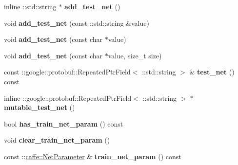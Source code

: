 \begin{DoxyCompactItemize}
inline \+::std\+::string $\ast$ {\bfseries add\+\_\+test\+\_\+net} ()
\item 
\mbox{\label{classcaffe_1_1_solver_parameter_a175c3d63f60d157a61fb1f4213c0b5a3}} 
void {\bfseries add\+\_\+test\+\_\+net} (const \+::std\+::string \&value)
\item 
\mbox{\label{classcaffe_1_1_solver_parameter_a7a4725f8ad48670dce5179ced7a8e76b}} 
void {\bfseries add\+\_\+test\+\_\+net} (const char $\ast$value)
\item 
\mbox{\label{classcaffe_1_1_solver_parameter_a3d6b70555df3bf7cec2657ca2fa1e87d}} 
void {\bfseries add\+\_\+test\+\_\+net} (const char $\ast$value, size\+\_\+t size)
\item 
\mbox{\label{classcaffe_1_1_solver_parameter_a72d6b993f84ab0ef1108049ac50b0f70}} 
const \+::google\+::protobuf\+::\+Repeated\+Ptr\+Field$<$ \+::std\+::string $>$ \& {\bfseries test\+\_\+net} () const
\item 
\mbox{\label{classcaffe_1_1_solver_parameter_a550350a34dc52446a7dadb5e0d40029c}} 
inline \+::google\+::protobuf\+::\+Repeated\+Ptr\+Field$<$ \+::std\+::string $>$ $\ast$ {\bfseries mutable\+\_\+test\+\_\+net} ()
\item 
\mbox{\label{classcaffe_1_1_solver_parameter_aa324451e3753df304e4265c2bc2e7bf9}} 
bool {\bfseries has\+\_\+train\+\_\+net\+\_\+param} () const
\item 
\mbox{\label{classcaffe_1_1_solver_parameter_a95a45bbc191886034efdf83141dfcb36}} 
void {\bfseries clear\+\_\+train\+\_\+net\+\_\+param} ()
\item 
\mbox{\label{classcaffe_1_1_solver_parameter_a919944b6022af30e6a142fc17935a3d0}} 
const \+::\mbox{\hyperlink{classcaffe_1_1_net_parameter}{caffe\+::\+Net\+Parameter}} \& {\bfseries train\+\_\+net\+\_\+param} () const
\item 
\mbox{\label{classcaffe_1_1_solver_parameter_aa6ea88d4041a953b49402bc29a94c4d1}} 

\end{DoxyCompactItemize}

